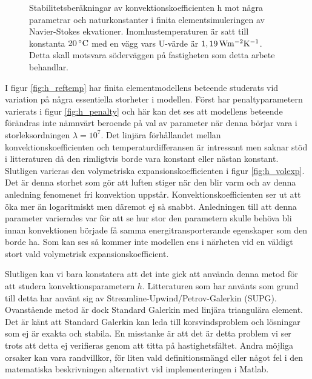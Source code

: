 \begin{figure}[hpbt]
\caption{\label{fig:konv_param}Stabilitetsberäkningar av konvektionskoefficienten h mot några
parametrar och naturkonstanter i finita elementsimuleringen av Navier-Stokes ekvationer.
Inomhustemperaturen är satt till konstanta $\unit[20]{^\circ C}$ med en vägg vars U-värde är
$\unit[1,19]{ Wm^{-2}K^{-1}}$. Detta skall motsvara söderväggen på fastigheten som detta arbete behandlar.}

\end{figure}

I figur \ref{fig:h_reftemp} har finita elementmodellens beteende studerats vid variation på några essentiella storheter i modellen.
Först har penaltyparametern varierats i figur \ref{fig:h_penalty} och här kan det ses att modellens beteende förändras inte nämnvärt
beroende på val av parameter när denna börjar vara i storleksordningen $\lambda = 10^7$. Det linjära förhållandet mellan
konvektionskoefficienten och temperaturdifferansen är intressant men saknar stöd i litteraturen då den rimligtvis borde vara
konstant eller nästan konstant. Slutligen varieras den volymetriska expansionskoefficienten
i figur \ref{fig:h_volexp}. Det är denna storhet
som gör att luften stiger när den blir varm och av denna anledning fenomenet fri konvektion uppstår. Konvektionskoefficienten
ser ut att öka mer än logaritmiskt men däremot ej så snabbt. Anledningen till att denna parameter varierades var för
att se hur stor den parametern skulle behöva bli innan konvektionen började få samma energitransporterande egenskaper
som den borde ha. Som kan ses så kommer inte modellen ens i närheten vid en väldigt stort vald volymetrisk expansionskoefficient.

Slutligen kan vi bara konstatera att det inte gick att använda denna metod för att studera konvektionsparametern $h$. Litteraturen
som har använts som grund till detta har använt sig av Streamline-Upwind/Petrov-Galerkin (SUPG). \cite{heinrich88}\cite{roy05} Ovanstående metod är dock
Standard Galerkin med linjära triangulära element. Det är känt att Standard Galerkin kan leda till korsvindsproblem och lösningar som ej är
exakta och stabila.\cite{segal2011}
En misstanke är att det är detta problem vi ser trots att detta ej verifieras genom att titta på hastighetsfältet. Andra
möjliga orsaker kan vara randvillkor, för liten vald definitionsmängd eller något fel i den matematiska beskrivningen alternativt
vid implementeringen i Matlab.
